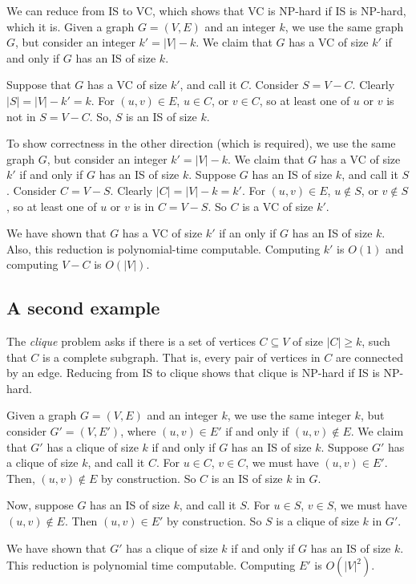 \documentclass[titlepage, 12pt, leqno]{article}
\begin{document}
We can reduce from IS to VC, which shows that VC is NP-hard if IS is NP-hard,
which it is. Given a graph $G=(V,E)$ and an integer $k$, we use the same graph
$G$, but consider an integer $k' = |V|-k$. We claim that $G$ has a VC of size
$k'$ if and only if $G$ has an IS of size $k$.

Suppose that $G$ has a VC of size $k'$, and call it $C$. Consider $S = V-C$.
Clearly $|S| = |V|-k' = k$. For $(u,v) \in E$, $u \in C$, or $v \in C$, so at
least one of $u$ or $v$ is not in $S = V-C$. So, $S$ is an IS of size $k$.

To show correctness in the other direction (which is required), we use the same
graph $G$, but consider an integer $k' = |V| -k$. We claim that $G$ has a VC of
size $k'$ if and only if $G$ has an IS of size $k$. Suppose $G$ has an IS of
size $k$, and call it $S$. Consider $C = V-S$. Clearly $|C| = |V|-k=k'$. For
$(u,v) \in  E$, $u \notin S$, or $v \notin S$, so at least one of $u$ or $v$ is
in $C=V-S$. So $C$ is a VC of size $k'$.

We have shown that $G$ has a VC of size $k'$ if an only if $G$ has an IS of size
$k$. Also, this reduction is polynomial-time computable. Computing $k'$ is 
$O(1)$ and computing $V-C$ is $O(|V|)$.

\subsection{A second example}
The \textit{clique} problem asks if there is a set of vertices $C \subseteq V$ of
size $|C| \ge k$, such that $C$ is a complete subgraph. That is, every pair of
vertices in $C$ are connected by an edge. Reducing from IS to clique shows that
clique is NP-hard if IS is NP-hard.

Given a graph $G = (V,E)$ and an integer $k$, we use the same integer $k$, but
consider $G' = (V,E')$, where $(u,v) \in E'$ if and only if $(u,v) \notin E$.
We claim that $G'$ has a clique of size $k$ if and only if $G$ has an IS of
size $k$. Suppose $G'$ has a clique of size $k$, and call it $C$. For
$u \in C$, $v \in C$, we must have $(u,v) \in E'$. Then, $(u,v) \notin E$ by
construction. So $C$ is an IS of size $k$ in $G$.

Now, suppose $G$ has an IS of size $k$, and call it $S$. For $u \in S$, $v \in 
S$, we must have $(u,v) \notin E$. Then $(u,v) \in E'$ by construction. So
$S$ is a clique of size $k$ in $G'$.

We have shown that $G'$ has a clique of size $k$ if and only if $G$ has an IS of
size $k$. This reduction is polynomial time computable. Computing $E'$ is
$O(|V|^{2})$.
\end{document}
